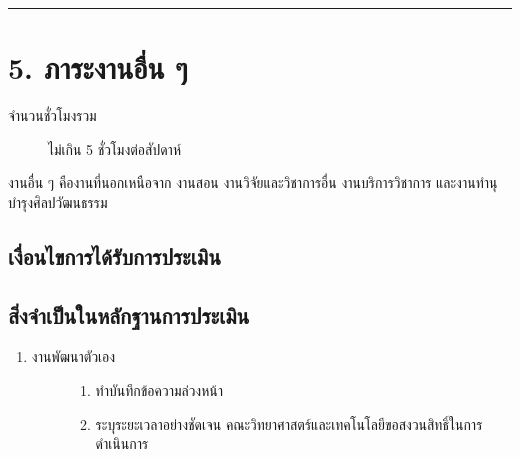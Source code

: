 \documentclass[a4paper,12pt,english]{sphinxmanual}
\begin{document}
\bigskip\hrule\bigskip



\section{5. ภาระงานอื่น ๆ}
\label{\detokenize{workload_rubric:id87}}\begin{description}
\item[{จำนวนชั่วโมงรวม}] \leavevmode
ไม่เกิน 5 ชั่วโมงต่อสัปดาห์

\end{description}

งานอื่น ๆ คืองานที่นอกเหนือจาก งานสอน งานวิจัยและวิชาการอื่น งานบริการวิชาการ และงานทำนุบำรุงศิลปวัฒนธรรม


\subsection{เงื่อนไขการได้รับการประเมิน}
\label{\detokenize{workload_rubric:id88}}

\subsection{สิ่งจำเป็นในหลักฐานการประเมิน}
\label{\detokenize{workload_rubric:id89}}\begin{enumerate}
%
\item {} \begin{description}
\item[{งานพัฒนาตัวเอง}] \leavevmode\begin{enumerate}
%
\item {} 
 ทำบันทึกข้อความล่วงหน้า

\item {} 
 ระบุระยะเวลาอย่างชัดเจน คณะวิทยาศาสตร์และเทคโนโลยีขอสงวนสิทธิ์ในการดำเนินการ

\end{enumerate}

\end{description}

\end{enumerate}
\end{document}
